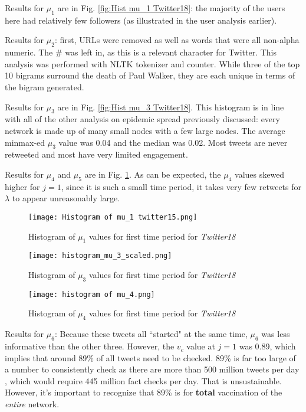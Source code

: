 \documentclass[preprint,review,12pt]{elsarticle}
\begin{document}
Results for $\mu_1$ are in Fig. \ref{fig:Hist mu_1 Twitter18}: the majority of the users here had relatively few followers (as illustrated in the user analysis earlier). 

Results for $\mu_2$: first, URLs were removed as well as words that were all non-alpha numeric. The \# was left in, as this is a relevant character for Twitter. This analysis was performed with NLTK tokenizer and counter. While three of the top 10 bigrams surround the death of Paul Walker, they are each unique in terms of the bigram generated. 

Results for $\mu_3$ are in Fig. \ref{fig:Hist mu_3 Twitter18}.
This histogram is in line with all of the other analysis on epidemic spread previously discussed: every network is made up of many small nodes with a few large nodes. The average minmax-ed $\mu_3$ value was 0.04 and the median was 0.02. Most tweets are never retweeted and most have very limited engagement. 

Results for $\mu_4$ and $\mu_5$ are in Fig. \ref{fig:Hist mu_4 Twitter18}. As can be expected, the $\mu_4$ values skewed higher for $j=1$, since it is such a small time period, it takes very few retweets for $\lambda$ to appear unreasonably large.  

\begin{figure}[h]
\centering
{}
  \texttt{[image: Histogram of mu\_1 twitter15.png]}
    \caption{Histogram of $\mu_1$ values for first time period for \textit{Twitter18}}
    \label{fig:Hist mu_1 Twitter18}
\endminipage\hfill
{}
  \texttt{[image: histogram\_mu\_3\_scaled.png]}
    \caption{Histogram of $\mu_3$ values for first time period for \textit{Twitter18}}
    \label{fig:Hist mu_3 Twitter18}
\endminipage\hfill
{}
  \texttt{[image: histogram of mu\_4.png]}
    \caption{Histogram of $\mu_4$ values for first time period for \textit{Twitter18}}
    \label{fig:Hist mu_4 Twitter18}
\endminipage
\end{figure}
Results for $\mu_6$:
Because these tweets all ``started" at the same time, $\mu_6$ was less informative than the other three. However, the $v_c$ value at $j=1$ was 0.89, which implies that around 89\% of all tweets need to be checked. 89\% is far too large of a number to consistently check as there are more than 500 million tweets per day \cite{raffi2013tweets}, which would require 445 million fact checks per day. That is unsustainable. However, it's important to recognize that 89\% is for \textbf{total} vaccination of the \textit{entire} network.
\end{document}
